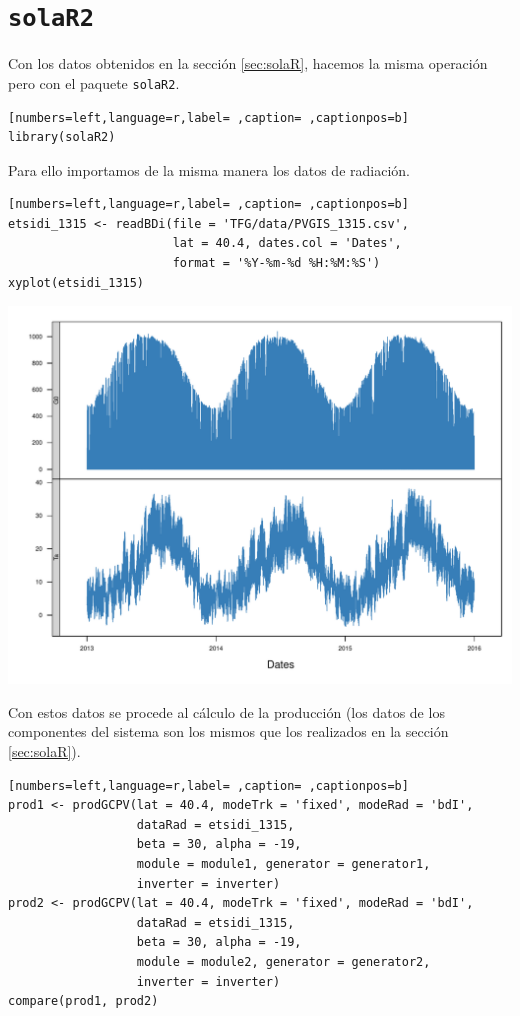 \section{\texttt{solaR2}}
\label{sec:org0613f49}
\label{sec:solaR2}
Con los datos obtenidos en la sección \ref{sec:solaR}, hacemos la misma operación pero con el paquete \texttt{solaR2}.
\begin{lstlisting}[numbers=left,language=r,label= ,caption= ,captionpos=b]
library(solaR2)
\end{lstlisting}

Para ello importamos de la misma manera los datos de radiación.
\begin{lstlisting}[numbers=left,language=r,label= ,caption= ,captionpos=b]
etsidi_1315 <- readBDi(file = 'TFG/data/PVGIS_1315.csv',
                       lat = 40.4, dates.col = 'Dates',
                       format = '%Y-%m-%d %H:%M:%S')
xyplot(etsidi_1315)
\end{lstlisting}

\begin{center}
\includegraphics[width=\textwidth]{figuras/ejemplos3.pdf}
\end{center}
Con estos datos se procede al cálculo de la producción (los datos de los componentes del sistema son los mismos que los realizados en la sección \ref{sec:solaR}).
\begin{lstlisting}[numbers=left,language=r,label= ,caption= ,captionpos=b]
prod1 <- prodGCPV(lat = 40.4, modeTrk = 'fixed', modeRad = 'bdI',
                  dataRad = etsidi_1315,
                  beta = 30, alpha = -19, 
                  module = module1, generator = generator1,
                  inverter = inverter)
prod2 <- prodGCPV(lat = 40.4, modeTrk = 'fixed', modeRad = 'bdI',
                  dataRad = etsidi_1315,
                  beta = 30, alpha = -19, 
                  module = module2, generator = generator2,
                  inverter = inverter)
compare(prod1, prod2)
\end{lstlisting}

